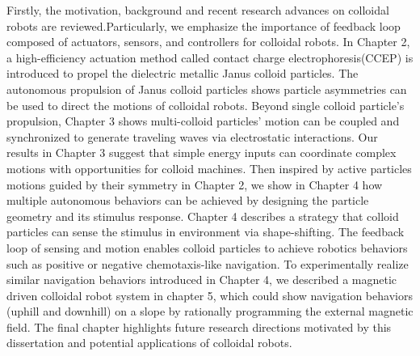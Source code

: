 \begin{titlepage}
Firstly, the motivation, background and recent research  advances on colloidal robots are reviewed.Particularly, we emphasize the importance of feedback
loop composed of actuators, sensors, and controllers for colloidal robots.  In Chapter 2,  a high-efficiency actuation method called contact charge electrophoresis(CCEP) is introduced to propel the dielectric metallic Janus colloid particles.  The autonomous propulsion of Janus colloid particles shows particle asymmetries can be used to direct the motions of colloidal robots. Beyond single colloid particle's propulsion, Chapter 3 shows multi-colloid particles' motion can be coupled and synchronized to generate  traveling waves via electrostatic interactions.   Our results in Chapter 3 suggest that simple energy inputs can coordinate complex motions with opportunities for colloid machines.  Then inspired by active particles motions guided by their symmetry in Chapter 2, we show in Chapter 4 how multiple autonomous behaviors can be achieved by designing the particle geometry and its stimulus response. Chapter 4 describes a strategy that colloid particles can sense the stimulus in environment via shape-shifting. The feedback loop of sensing and motion enables colloid particles to achieve robotics behaviors such as positive or negative chemotaxis-like navigation. To experimentally realize similar navigation behaviors introduced in Chapter 4,  we described a magnetic driven colloidal robot system in chapter 5, which could show navigation behaviors (uphill and downhill) on a slope by rationally  programming the external magnetic field.  The final chapter  highlights future research  directions motivated by this dissertation and potential applications of colloidal robots.

\vspace*{\fill}
\end{titlepage}
